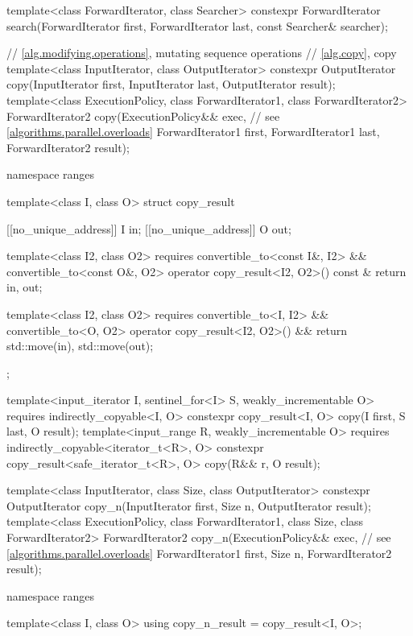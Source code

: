 \begin{codeblock}
{  template<class ForwardIterator, class Searcher>
    constexpr ForwardIterator
      search(ForwardIterator first, ForwardIterator last, const Searcher& searcher);

  // \ref{alg.modifying.operations}, mutating sequence operations
  // \ref{alg.copy}, copy
  template<class InputIterator, class OutputIterator>
    constexpr OutputIterator copy(InputIterator first, InputIterator last,
                                  OutputIterator result);
  template<class ExecutionPolicy, class ForwardIterator1, class ForwardIterator2>
    ForwardIterator2 copy(ExecutionPolicy&& exec,               // see \ref{algorithms.parallel.overloads}
                          ForwardIterator1 first, ForwardIterator1 last,
                          ForwardIterator2 result);

  namespace ranges {
    template<class I, class O>
    struct copy_result {
      [[no_unique_address]] I in;
      [[no_unique_address]] O out;

      template<class I2, class O2>
        requires convertible_to<const I&, I2> && convertible_to<const O&, O2>
        operator copy_result<I2, O2>() const & {
          return {in, out};
        }

      template<class I2, class O2>
        requires convertible_to<I, I2> && convertible_to<O, O2>
        operator copy_result<I2, O2>() && {
          return {std::move(in), std::move(out)};
        }
    };

    template<input_iterator I, sentinel_for<I> S, weakly_incrementable O>
      requires indirectly_copyable<I, O>
      constexpr copy_result<I, O>
        copy(I first, S last, O result);
    template<input_range R, weakly_incrementable O>
      requires indirectly_copyable<iterator_t<R>, O>
      constexpr copy_result<safe_iterator_t<R>, O>
        copy(R&& r, O result);
  }

  template<class InputIterator, class Size, class OutputIterator>
    constexpr OutputIterator copy_n(InputIterator first, Size n,
                                    OutputIterator result);
  template<class ExecutionPolicy, class ForwardIterator1, class Size,
           class ForwardIterator2>
    ForwardIterator2 copy_n(ExecutionPolicy&& exec,             // see \ref{algorithms.parallel.overloads}
                            ForwardIterator1 first, Size n,
                            ForwardIterator2 result);

  namespace ranges {
    template<class I, class O>
    using copy_n_result = copy_result<I, O>;

}}
\end{codeblock}

